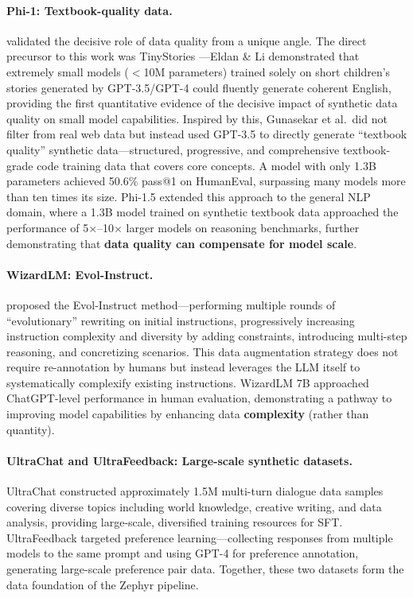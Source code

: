 \paragraph{Phi-1: Textbook-quality data.}
 validated the decisive role of data quality from a unique angle.
The direct precursor to this work was TinyStories \cite{eldan2023tinystories}---Eldan \& Li demonstrated that extremely small models ($<$10M parameters) trained solely on short children's stories generated by GPT-3.5/GPT-4 could fluently generate coherent English, providing the first quantitative evidence of the decisive impact of synthetic data quality on small model capabilities.
Inspired by this, Gunasekar et al.\ did not filter from real web data
but instead used GPT-3.5 to directly generate ``textbook quality'' synthetic data---structured, progressive, and comprehensive textbook-grade code training data that covers core concepts.
A model with only 1.3B parameters achieved 50.6\% pass@1 on HumanEval,
surpassing many models more than ten times its size.
Phi-1.5 \cite{li2023phi15} extended this approach to the general NLP domain,
where a 1.3B model trained on synthetic textbook data approached the performance of 5$\times$--10$\times$ larger models on reasoning benchmarks,
further demonstrating that \textbf{data quality can compensate for model scale}.

\paragraph{WizardLM: Evol-Instruct.}
 proposed the Evol-Instruct method---performing multiple rounds of ``evolutionary'' rewriting on initial instructions,
progressively increasing instruction complexity and diversity by adding constraints, introducing multi-step reasoning, and concretizing scenarios.
This data augmentation strategy does not require re-annotation by humans
but instead leverages the LLM itself to systematically complexify existing instructions.
WizardLM 7B approached ChatGPT-level performance in human evaluation,
demonstrating a pathway to improving model capabilities by enhancing data \textbf{complexity} (rather than quantity).

\paragraph{UltraChat and UltraFeedback: Large-scale synthetic datasets.}
UltraChat \cite{ding2023ultrachat} constructed approximately 1.5M multi-turn dialogue data samples covering diverse topics including world knowledge, creative writing, and data analysis,
providing large-scale, diversified training resources for SFT.
UltraFeedback \cite{cui2023ultrafeedback} targeted preference learning---collecting responses from multiple models to the same prompt and using GPT-4 for preference annotation,
generating large-scale preference pair data.
Together, these two datasets form the data foundation of the Zephyr \cite{tunstall2023zephyr} pipeline.

